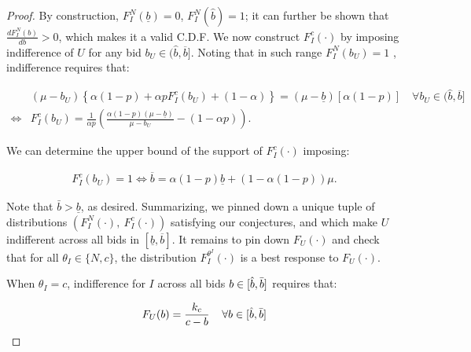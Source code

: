 \documentclass[11pt]{article}
\theoremstyle{plain}
\theoremstyle{definition}
\theoremstyle{plain}
\theoremstyle{plain}
\theoremstyle{plain}
\theoremstyle{plain}
\numberwithin{equation}{section}
\begin{document}
\begin{proof}
\vspace{4mm}

\noindent By construction, $ F_I^N(\underline{b}) =0$, $F_I^N(\hat{b}) = 1$; it can further be shown that $\frac{d F_I^N(b)}{d b} > 0$, which makes it a valid C.D.F. We now construct $ F_I^c(\cdot) $ by imposing indifference of $ U $ for any bid $ b_U \in (\hat{b},\overline{b}]$. Noting that in such range $ F_I^N(b_U) = 1 $ , indifference requires that:

\begin{align*}
    & (\mu - b_U) \left\{ \alpha(1-p) + \alpha p F_I^c(b_U) + (1 - \alpha)  \right\} = (\mu-\underline{b})\left[\alpha(1-p)\right] \quad \forall b_U  \in (\hat{b},\overline{b}] \\[8pt]
    \iff & F_I^c(b_U) = \frac{1}{\alpha p} \left( \frac{\alpha(1-p)(\mu-\underline{b})}{\mu-b_U} - (1-\alpha p)\right).
\end{align*}

\vspace{4mm}

\noindent We can determine the upper bound of the support of $ F_I^c(\cdot) $ imposing:

\begin{align*}
     F_I^c(b_U) = 1 \iff \overline{b} = 
        \alpha(1-p) \underline{b} + \left(1-\alpha(1-p) \right)\mu.
\end{align*}

\vspace{4mm}

\noindent Note that $\bar{b}>\underline{b}$, as desired. Summarizing, we pinned down a unique tuple of distributions $ \left( F_I^N (\cdot), \  F_I^c (\cdot) \right) $ satisfying our conjectures, and which make $ U $ indifferent across all bids in $ [\underline{b}, \overline{b}] $. It remains to pin down $ F_U(\cdot) $ and check that for all $ \theta_I \in \{ N, c \} $, the distribution $ F_I^{\theta^I} (\cdot) $ is a best response to $ F_U(\cdot) $.

\vspace{0.4cm}

\noindent When $ \theta_I = c $, indifference for $ I $ across all bids $ b \in [\hat{b}, \Bar{b}] $ requires that:

\begin{equation*}
 F_U(b) = \frac{k_c}{c - b} \hspace{0.4cm} \forall b \in [\hat{b}, \Bar{b}]    
\end{equation*}

\vspace{0.4cm}


\end{proof}
\end{document}
